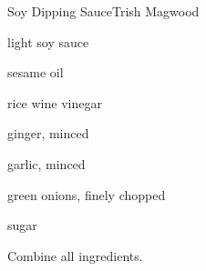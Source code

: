 \begin{recipe}{Soy Dipping Sauce}{Trish Magwood}{}

\begin{ingredients}
\item \C{\half} light soy sauce
\item {} sesame oil
\item {} rice wine vinegar
\item \Tp{\half} ginger, minced
\item \Tp{\half} garlic, minced
\item \Tp{1\half} green onions, finely chopped
\item \Tp{\half} sugar
\end{ingredients}

\begin{directions}
\item Combine all ingredients.
\end{directions}

\end{recipe}
